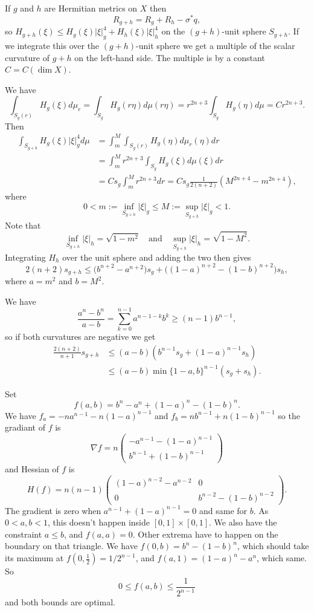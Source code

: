 \documentclass[11pt]{amsart}
\theoremstyle{definition}
\def\qandq{\quad\text{and}\quad}
\begin{document}
If $g$ and $h$ are Hermitian metrics on $X$ then
\[
R_{g + h} = R_g + R_h - \sigma^*q,
\]
so
$
H_{g+h}(\xi) \leq H_g(\xi)|\xi|_g^4 + H_h(\xi) |\xi|_h^4
$
on the $(g+h)$-unit sphere $S_{g+h}$.
If we integrate this over the $(g+h)$-unit sphere we get a multiple of the
scalar curvature of $g+h$ on the left-hand side.
The multiple is by a constant $C = C(\dim X)$.

We have
$$
\int_{S_g(r)} H_g(\xi) d\mu_r
= \int_{S_g} H_g(r \eta) d\mu(r \eta)
= r^{2n+3} \int_{S_g} H_g(\eta) d\mu
= C r^{2n+3}.
$$
Then
\begin{align*}
\int_{S_{g+h}} H_{g}(\xi) |\xi|^4_g d\mu
&= \int_m^M \int_{S_g(r)} H_g(\eta) d\mu_r(\eta) dr
\\
&= \int_m^M r^{2n+3} \int_{S_g} H_g(\xi) d\mu(\xi) dr
\\
&= C s_g \int_m^M r^{2n+3} dr
= C s_g \frac{1}{2(n+2)}(M^{2n+4} - m^{2n+4}),
\end{align*}
where
$$
0 < m := \inf_{S_{g+h}} |\xi|_g \leq M := \sup_{S_{g+h}} |\xi|_g < 1.
$$
Note that
$$
\inf_{S_{g+h}} |\xi|_h = \sqrt{1-m^2}
\qandq
\sup_{S_{g+h}} |\xi|_h = \sqrt{1-M^2}.
$$
Integrating $H_h$ over the unit sphere and adding the two then gives
$$
2(n+2) s_{g+h}
\leq
\bigl(b^{n+2} - a^{n+2}\bigr) s_g
+ \bigl((1-a)^{n+2} - (1-b)^{n+2}\bigr) s_h,
$$
where $a = m^2$ and $b = M^2$.

We have
$$
\frac{a^n - b^n}{a - b}
= \sum_{k=0}^{n-1} a^{n-1-k} b^k
\geq (n-1) b^{n-1},
$$
so if both curvatures are negative we get
\begin{align*}
\frac{2(n+2)}{n+1} s_{g+h}
&\leq
(a-b)(b^{n-1} s_g + (1-a)^{n-1} s_h)
\\
&\leq
(a-b) \min\{1-a, b\}^{n-1}(s_g + s_h).
\end{align*}

Set
$$
f(a, b) = b^n - a^n + (1-a)^n - (1-b)^n.
$$
We have $f_a = -n a^{n-1} - n(1-a)^{n-1}$ and $f_b = n b^{n-1} + n(1-b)^{n-1}$
so the gradiant of $f$ is
$$
\nabla f = n \begin{pmatrix}
- a^{n-1} - (1-a)^{n-1}
\\
b^{n-1} + (1-b)^{n-1}
\end{pmatrix}
$$
and Hessian of $f$ is
$$
H(f) =
n(n-1)
\begin{pmatrix}
(1-a)^{n-2} - a^{n-2} & 0
\\
0 & b^{n-2} - (1-b)^{n-2}
\end{pmatrix}.
$$
The gradient is zero when $a^{n-1} + (1-a)^{n-1} = 0$ and same for $b$. As
$0 < a, b < 1$, this doesn't happen inside $[0,1] \times [0,1]$.
We also have the constraint $a \leq b$, and $f(a,a) = 0$.
Other extrema have to happen on the boundary on that triangle. We have
$f(0,b) = b^n - (1-b)^n$, which should take its maximum at $f(0,\frac12) =
1/2^{n-1}$, and $f(a,1) = (1-a)^n - a^n$, which same. So
$$
0 \leq f(a,b) \leq \frac 1{2^{n-1}}
$$
and both bounds are optimal.
\end{document}
